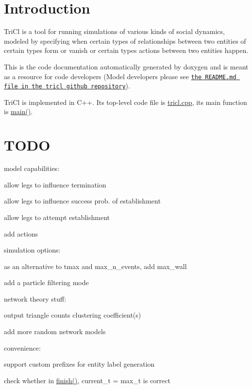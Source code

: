 \section*{Introduction }

Tri\+Cl is a tool for running simulations of various kinds of social dynamics, modeled by specifying when certain types of relationships between two entities of certain types form or vanish or certain types actions between two entities happen.

This is the code documentation automatically generated by doxygen and is meant as a resource for code developers (Model developers please see \href{https://github.com/mensch72/tricl}{\tt the R\+E\+A\+D\+M\+E.\+md file in the tricl github repository}).

Tri\+Cl is implemented in C++. Its top-\/level code file is \hyperlink{tricl_8cpp}{tricl.\+cpp}, its main function is \hyperlink{tricl_8cpp_a0ddf1224851353fc92bfbff6f499fa97}{main()}.

\section*{T\+O\+DO }

model capabilities\+:
\begin{DoxyItemize}
\item allow legs to influence termination
\item allow legs to influence success prob. of establishment
\item allow legs to attempt establishment
\item add actions
\end{DoxyItemize}

simulation options\+:
\begin{DoxyItemize}
\item as an alternative to tmax and max\+\_\+n\+\_\+events, add max\+\_\+wall
\item add a particle filtering mode
\end{DoxyItemize}

network theory stuff\+:
\begin{DoxyItemize}
\item output triangle counts clustering coefficient(s)
\item add more random network models
\end{DoxyItemize}

convenience\+:
\begin{DoxyItemize}
\item support custom prefixes for entity label generation
\item check whether in \hyperlink{finish_8cpp_a6dfe1abe0d1eb3ddc1ca081de98b5342}{finish()}, current\+\_\+t = max\+\_\+t is correct
\end{DoxyItemize}

